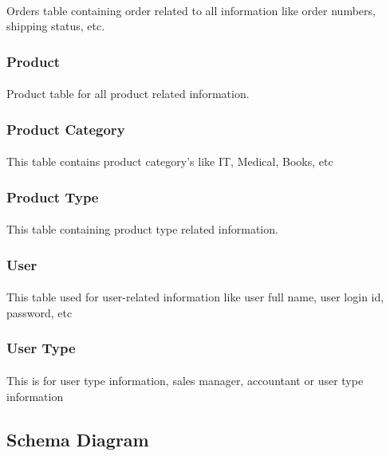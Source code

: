 \documentclass{article}
\begin{document}
	\paragraph{}
	Orders table containing order related to all information like order numbers, shipping status, etc.
	\subsubsection{Product}
	\paragraph{}
	Product table for all product related information.
	\subsubsection{Product Category}
	\paragraph{}
	This table contains product category’s like IT, Medical, Books, etc
	\subsubsection{Product Type}
	\paragraph{}
	This table containing product type related information.
	\subsubsection{User}
	\paragraph{}
	This table used for user-related information like user full name, user login id, password, etc
	\subsubsection{User Type}
	\paragraph{}
	This is for user type information, sales manager, accountant or user type information
	\pagebreak
	\subsection{Schema Diagram}
\end{document}

